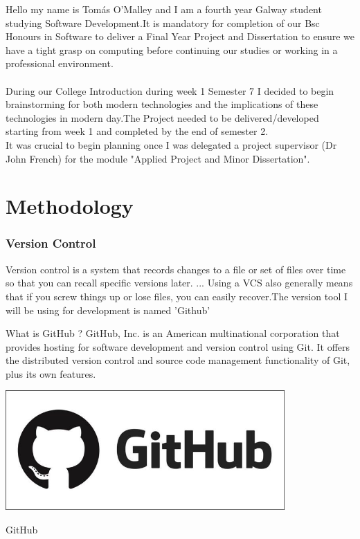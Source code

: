 Hello my name is Tomás O'Malley and I am a fourth year Galway student studying Software Development.It is mandatory for completion of our Bsc Honours in Software to deliver a Final Year Project and Dissertation  to ensure we have a tight grasp on computing before continuing our studies or working in a professional environment.\\

\\During our College Introduction during week 1 Semester 7 I decided to begin brainstorming for both modern technologies and the implications of these technologies in modern day.The Project needed to be delivered/developed starting from week 1 and completed by the end of semester 2.\\

It was crucial to begin planning once I was delegated a project supervisor (Dr John French) for the module "Applied Project and Minor Dissertation".



\chapter{Methodology}
    \subsection{ Version Control  }
    Version control is a system that records changes to a file or set of files over time so that you can recall specific versions later. ... Using a VCS also generally means that if you screw things up or lose files, you can easily recover.The version tool I will be using for development is named 'Github'

What is GitHub ? GitHub, Inc. is an American multinational corporation that provides hosting for software development and version control using Git. It offers the distributed version control and source code management functionality of Git, plus its own features. 
    

    \begin{center}    
      \includegraphics[width=0.8\textwidth]{final-year-project-template-master/img/githubBanner.jpeg}
      \caption{GitHub}
  \label{fig:github1}

      
      


    \end{center}
    

